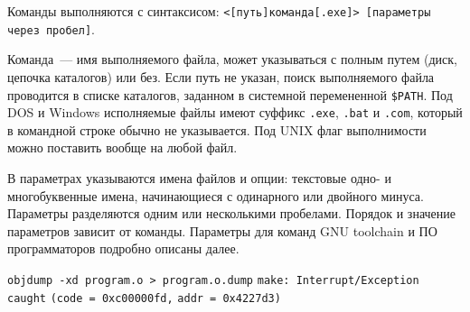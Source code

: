 Команды выполняются с синтаксисом: 
\verb|<[путь]команда[.exe]> [параметры через пробел]|.

Команда\ --- имя выполняемого файла, может указываться с полным путем (диск,
цепочка каталогов) или без. Если путь не указан, поиск выполняемого файла
проводится в списке каталогов, заданном в системной перемененной \verb|$PATH|.
Под DOS и Windows исполняемые файлы имеют суффикс \verb|.exe|, \verb|.bat| и
\verb|.com|, который в командной строке обычно не указывается. Под UNIX флаг
выполнимости можно поставить вообще на любой файл.

В параметрах указываются имена файлов и опции: текстовые одно- и многобуквенные
имена, начинающиеся с одинарного или двойного минуса. Параметры разделяются
одним или несколькими пробелами. Порядок и значение параметров зависит от
команды. Параметры для команд GNU toolchain и ПО программаторов подробно описаны
далее.

\bigskip
{}
\verb|objdump -xd program.o > program.o.dump| 
\verb|make: Interrupt/Exception caught| \verb|(code = 0xc00000fd,|
\verb|addr = 0x4227d3)|
